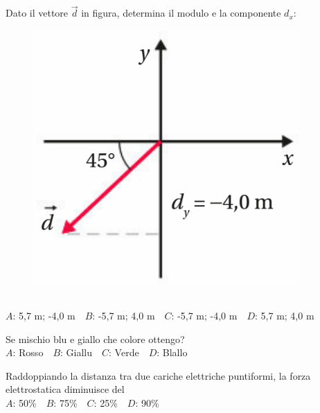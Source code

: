 \mcquestionfooter



\def\mcquestionnumber{12}


\mcquestionheader Dato il vettore $\vec{d}$ in figura, determina il modulo e la componente $d_x$: \begin{figure}[h!]   \begin{center}     \includegraphics[scale=0.35]{vettored.png}   \end{center} \end{figure}\\
{$A$}: 5,7 m; -4,0 m\ \ {$B$}: -5,7 m; 4,0 m\ \ {$C$}: -5,7 m; -4,0 m\ \ {$D$}: 5,7 m; 4,0 m\ \ 

\mcquestionfooter



\mcpaperfooter

\def\mcserialnumber{21}
\mcpaperheader


\def\mcquestionnumber{1}


\mcquestionheader Se mischio blu e giallo che colore ottengo?\\
{$A$}: Rosso\ \ {$B$}: Giallu\ \ {$C$}: Verde\ \ {$D$}: Blallo\ \ 

\mcquestionfooter



\def\mcquestionnumber{2}


\mcquestionheader Raddoppiando la distanza tra due cariche elettriche puntiformi, la forza elettrostatica diminuisce del\\
{$A$}: 50\%\ \ {$B$}: 75\%\ \ {$C$}: 25\%\ \ {$D$}: 90\%\ \ 

\mcquestionfooter



